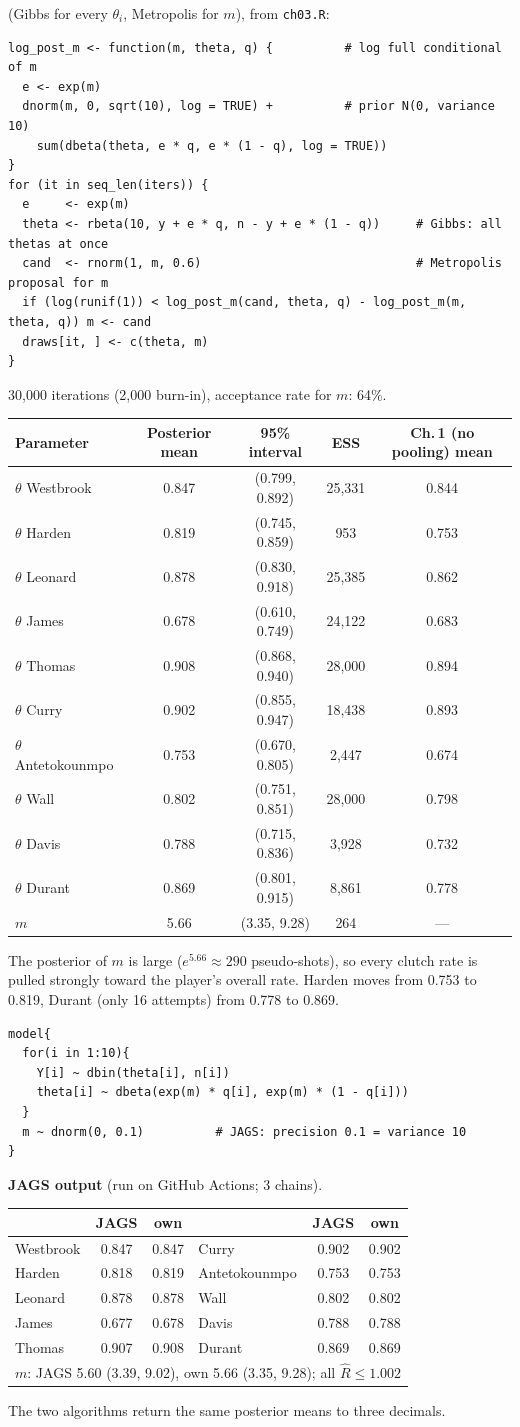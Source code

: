 \documentclass[11pt]{article}
\newenvironment{jagsbox}{\begin{sanity}\small\textbf{JAGS output} (run on GitHub Actions; 3 chains).\par\smallskip\centering}{\end{sanity}}
\newcommand{\JAGSexseven}{\begin{jagsbox}
\begin{tabular}{lcc|lcc}\toprule
 & JAGS & own & & JAGS & own\\\midrule
Westbrook & 0.847 & 0.847 & Curry & 0.902 & 0.902\\
Harden & 0.818 & 0.819 & Antetokounmpo & 0.753 & 0.753\\
Leonard & 0.878 & 0.878 & Wall & 0.802 & 0.802\\
James & 0.677 & 0.678 & Davis & 0.788 & 0.788\\
Thomas & 0.907 & 0.908 & Durant & 0.869 & 0.869\\
\multicolumn{6}{c}{$m$: JAGS 5.60 (3.39, 9.02), own 5.66 (3.35, 9.28); all $\hat R\le1.002$}\\\bottomrule
\end{tabular}\par\smallskip
The two algorithms return the same posterior means to three decimals.
\end{jagsbox}}
\begin{document}
 (Gibbs for every $\theta_i$, Metropolis for $m$), from \texttt{ch03.R}:
\begin{lstlisting}
log_post_m <- function(m, theta, q) {          # log full conditional of m
  e <- exp(m)
  dnorm(m, 0, sqrt(10), log = TRUE) +          # prior N(0, variance 10)
    sum(dbeta(theta, e * q, e * (1 - q), log = TRUE))
}
for (it in seq_len(iters)) {
  e     <- exp(m)
  theta <- rbeta(10, y + e * q, n - y + e * (1 - q))     # Gibbs: all thetas at once
  cand  <- rnorm(1, m, 0.6)                              # Metropolis proposal for m
  if (log(runif(1)) < log_post_m(cand, theta, q) - log_post_m(m, theta, q)) m <- cand
  draws[it, ] <- c(theta, m)
}
\end{lstlisting}
30{,}000 iterations (2{,}000 burn-in), acceptance rate for $m$: 64\%.
\begin{center}
\small
\begin{tabular}{lccc|c}\toprule
Parameter & Posterior mean & 95\% interval & ESS & Ch.\,1 (no pooling) mean\\\midrule
$\theta$ Westbrook & 0.847 & (0.799, 0.892) & 25{,}331 & 0.844\\
$\theta$ Harden & 0.819 & (0.745, 0.859) & 953 & 0.753\\
$\theta$ Leonard & 0.878 & (0.830, 0.918) & 25{,}385 & 0.862\\
$\theta$ James & 0.678 & (0.610, 0.749) & 24{,}122 & 0.683\\
$\theta$ Thomas & 0.908 & (0.868, 0.940) & 28{,}000 & 0.894\\
$\theta$ Curry & 0.902 & (0.855, 0.947) & 18{,}438 & 0.893\\
$\theta$ Antetokounmpo & 0.753 & (0.670, 0.805) & 2{,}447 & 0.674\\
$\theta$ Wall & 0.802 & (0.751, 0.851) & 28{,}000 & 0.798\\
$\theta$ Davis & 0.788 & (0.715, 0.836) & 3{,}928 & 0.732\\
$\theta$ Durant & 0.869 & (0.801, 0.915) & 8{,}861 & 0.778\\
$m$ & 5.66 & (3.35, 9.28) & 264 & ---\\\bottomrule
\end{tabular}
\end{center}
The posterior of $m$ is large ($e^{5.66}\approx290$ pseudo-shots), so every clutch rate is pulled strongly toward the player's overall rate. Harden moves from 0.753 to 0.819, Durant (only 16 attempts) from 0.778 to 0.869.

\begin{lstlisting}
model{
  for(i in 1:10){
    Y[i] ~ dbin(theta[i], n[i])
    theta[i] ~ dbeta(exp(m) * q[i], exp(m) * (1 - q[i]))
  }
  m ~ dnorm(0, 0.1)          # JAGS: precision 0.1 = variance 10
}
\end{lstlisting}
\JAGSexseven
\end{document}
